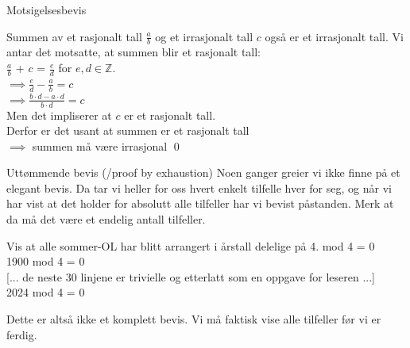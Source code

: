 \begin{frame}{Motsigelsesbevis}
    \begin{block}{Summen av et rasjonalt tall $\frac{a}{b}$ og et irrasjonalt tall $c$ også er et irrasjonalt tall.}
        Vi antar det motsatte, at summen blir et rasjonalt tall: \\
        \pause
        $\frac{a}{b}$ + $c$ = $\frac{e}{d}$ for $e, d \in \mathbb{Z}$.\\
        \pause
        $\implies \frac{e}{d} - \frac{a}{b} = c$\\
        \pause
        $\implies \frac{b\cdot d - a \cdot d}{b\cdot d} = c$\\
        \pause
        Men det impliserer at $c$ er et rasjonalt tall. \text{\Lightning}\\
        \pause
        Derfor er det usant at summen er et rasjonalt tall\\
        $\implies$ summen må være irrasjonal
        \qed
    \end{block}
\end{frame}

\begin{frame}{Uttømmende bevis (/proof by exhaustion)}
    Noen ganger greier vi ikke finne på et elegant bevis. Da tar vi heller for oss hvert enkelt tilfelle hver for seg, og når vi har vist at det holder for absolutt alle tilfeller har vi bevist påstanden. Merk at da må det være et endelig antall tilfeller.
    \pause
    \begin{block}{Vis at alle sommer-OL har blitt arrangert i årstall delelige på 4.}
         mod 4 = 0 \checkmark \\
        1900 mod 4 = 0 \checkmark \\
        {[... de neste 30 linjene er trivielle og etterlatt som en oppgave for leseren ...]}\\
        2024 mod 4 = 0 \checkmark
    \end{block}
    \pause
    Dette er altså ikke et komplett bevis. Vi må faktisk vise alle tilfeller før vi er ferdig.
\end{frame}
